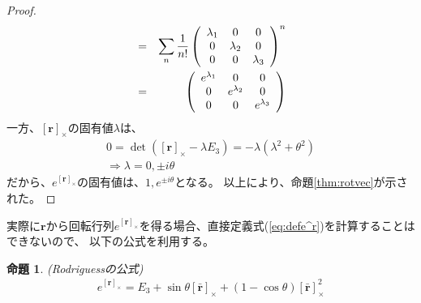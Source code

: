 \documentclass[10pt]{jarticle}
\newtheorem{Prp}{命題}[section]
\newcommand{\exprx}{e^{[\boldsymbol{r}]_{\times}}}
\newcommand{\rx}{[\boldsymbol{r}]_{\times}}
\begin{document}
\begin{proof}
\begin{eqnarray}
        &=& \sum_n \frac{1}{n!}
          \left(
            \begin{array}{c c c}
                \lambda_1&0&0\\
                0&\lambda_2&0\\
                0&0&\lambda_3
            \end{array}
          \right)^n \\
        &=&          \left(
            \begin{array}{c c c}
                e^{\lambda_1}&0&0\\
                0&e^{\lambda_2}&0\\
                0&0&e^{\lambda_3}
            \end{array}
          \right)
    \end{eqnarray}
    一方、$\rx$の固有値$\lambda$は、
    \begin{eqnarray}
        0 = \det(\rx-\lambda E_3) = -\lambda(\lambda^2+\theta^2) \\
        \Rightarrow \lambda = 0,\pm i\theta
    \end{eqnarray}
    だから、$\exprx$の固有値は、$1,e^{\pm i\theta}$となる。
    以上により、命題\ref{thm:rotvec}が示された。
\end{proof}

実際に$\boldsymbol{r}$から回転行列$e^{[\boldsymbol{r}]_{\times}}$を得る場合、直接定義式(\ref{eq:defe^r})を計算することはできないので、
以下の公式を利用する。

\begin{Prp}(Rodriguessの公式)
    \begin{eqnarray}
        \exprx = E_3 + \sin\theta [\boldsymbol{\bar r}]_{\times} + (1-\cos \theta)[\boldsymbol{\bar r}]_{\times}^2
    \end{eqnarray}
\end{Prp}
\end{document}
